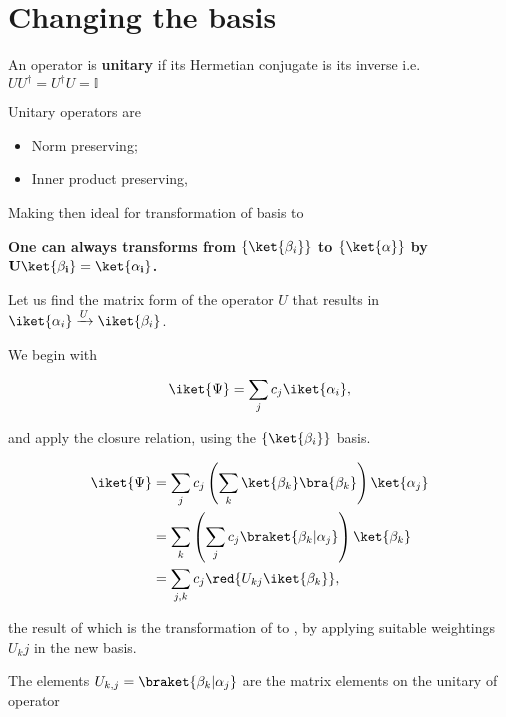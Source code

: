 \section{Changing the basis}
\begin{center}
	An operator is \textbf{unitary} if its Hermetian conjugate is its inverse i.e. $UU^{\dagger} = U^{\dagger}U = \mathbb{I}$
\end{center}

Unitary operators are 
\begin{itemize}
	\item Norm preserving;
	\item Inner product preserving,
\end{itemize}

Making then ideal for transformation of basis to

\begin{center}
	\textbf{One can always transforms from $\left\lbrace \ket{\beta_i} \right\rbrace$ to $\left\lbrace \ket{\alpha} \right\rbrace$ by $\mathbf{U\ket{\beta_i} = \ket{\alpha_i}}$.}
\end{center}

Let us find the matrix form of the operator $U$ that results in $\iket{\alpha_i} \xrightarrow{U} \iket{\beta_i}$.

We begin with 

\begin{equation}
\iket{\Psi} = \sum_jc_j\iket{\alpha_i},
\end{equation}

and apply the closure relation, using the $\left\lbrace \ket{\beta_i} \right\rbrace$ basis.

\begin{equation}
\begin{aligned}
\iket{\Psi} & = \sum_jc_j\left( \sum_k \ket{\beta_k}\bra{\beta_k} \right) \ket{\alpha_j} \\
& = \sum_k \left(\sum_jc_j \braket{\beta_k|\alpha_j} \right) \ket{\beta_k}\\
& = \sum_{j,k} c_j\red{U_{kj}\iket{\beta_k}},
\end{aligned}
\end{equation}

\noindent the result of which is the transformation of  to , by applying suitable weightings $U_kj$ in the new basis.

The elements $U_{k,j} = \braket{\beta_k|\alpha_j}$ are the matrix elements on the unitary of operator


